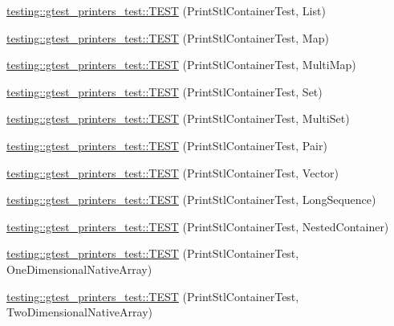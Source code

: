 \begin{DoxyCompactItemize}
\item 
\mbox{\hyperlink{namespacetesting_1_1gtest__printers__test_aaa135672ff79ecaef82c6046f2ab8d29}{testing\+::gtest\+\_\+printers\+\_\+test\+::\+T\+E\+ST}} (Print\+Stl\+Container\+Test, List)
\item 
\mbox{\hyperlink{namespacetesting_1_1gtest__printers__test_a3d701a1866f260a42411e9041894c49c}{testing\+::gtest\+\_\+printers\+\_\+test\+::\+T\+E\+ST}} (Print\+Stl\+Container\+Test, Map)
\item 
\mbox{\hyperlink{namespacetesting_1_1gtest__printers__test_a8a498c956a5b1c0358d126e1ad56fac0}{testing\+::gtest\+\_\+printers\+\_\+test\+::\+T\+E\+ST}} (Print\+Stl\+Container\+Test, Multi\+Map)
\item 
\mbox{\hyperlink{namespacetesting_1_1gtest__printers__test_abdc498462741033074f8e86b7c0bd480}{testing\+::gtest\+\_\+printers\+\_\+test\+::\+T\+E\+ST}} (Print\+Stl\+Container\+Test, Set)
\item 
\mbox{\hyperlink{namespacetesting_1_1gtest__printers__test_adaa3e1cfa3feca377b3958edb41fc0f1}{testing\+::gtest\+\_\+printers\+\_\+test\+::\+T\+E\+ST}} (Print\+Stl\+Container\+Test, Multi\+Set)
\item 
\mbox{\hyperlink{namespacetesting_1_1gtest__printers__test_ad5d3e873b00c1c9e3f5924e106dd7831}{testing\+::gtest\+\_\+printers\+\_\+test\+::\+T\+E\+ST}} (Print\+Stl\+Container\+Test, Pair)
\item 
\mbox{\hyperlink{namespacetesting_1_1gtest__printers__test_abfab1ea62f0285c0cdbcca500be0dac8}{testing\+::gtest\+\_\+printers\+\_\+test\+::\+T\+E\+ST}} (Print\+Stl\+Container\+Test, Vector)
\item 
\mbox{\hyperlink{namespacetesting_1_1gtest__printers__test_a55eca253f3365ad26183bcc711cb257a}{testing\+::gtest\+\_\+printers\+\_\+test\+::\+T\+E\+ST}} (Print\+Stl\+Container\+Test, Long\+Sequence)
\item 
\mbox{\hyperlink{namespacetesting_1_1gtest__printers__test_ad8fb463805baecdfb95154dec6ec4f27}{testing\+::gtest\+\_\+printers\+\_\+test\+::\+T\+E\+ST}} (Print\+Stl\+Container\+Test, Nested\+Container)
\item 
\mbox{\hyperlink{namespacetesting_1_1gtest__printers__test_a6dd59bbdea483f662fe62e2c55c106ce}{testing\+::gtest\+\_\+printers\+\_\+test\+::\+T\+E\+ST}} (Print\+Stl\+Container\+Test, One\+Dimensional\+Native\+Array)
\item 
\mbox{\hyperlink{namespacetesting_1_1gtest__printers__test_aca371c218e2248562ed258eaf385f4d1}{testing\+::gtest\+\_\+printers\+\_\+test\+::\+T\+E\+ST}} (Print\+Stl\+Container\+Test, Two\+Dimensional\+Native\+Array)

\end{DoxyCompactItemize}
